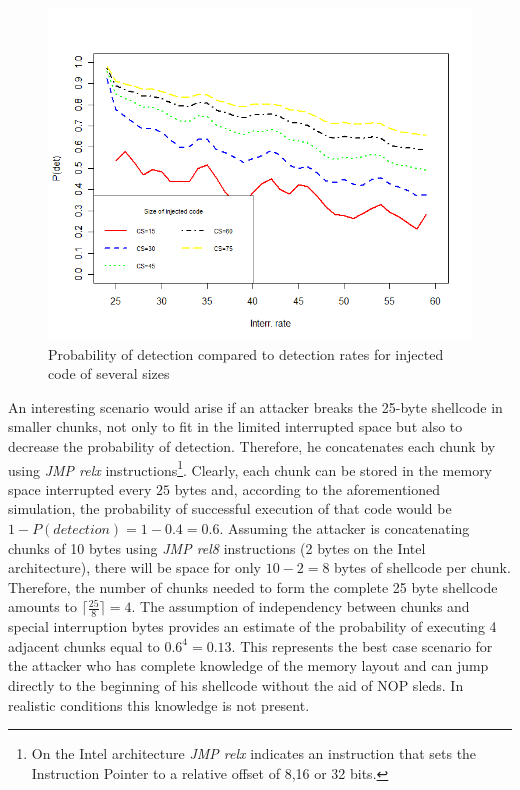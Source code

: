 \begin{figure}[htbp] 
\begin{center}
\includegraphics[scale=0.5]{images/bubble_det_intrate}
\caption{{Probability of detection compared to detection rates for injected code of several sizes}}
\label{det_intrate}
\end{center}
\end{figure}



An interesting scenario would arise if an attacker breaks the 25-byte shellcode in smaller chunks, not only to fit in the limited interrupted space but also to decrease the probability of detection. Therefore, he concatenates each chunk by using \emph{JMP relx} instructions\footnote{On the Intel architecture \emph{JMP relx} indicates an instruction that sets the Instruction Pointer to a relative offset of 8,16 or 32 bits.}. 
Clearly, each chunk can be stored in the memory space interrupted every $25$ bytes and, according to the aforementioned simulation, the probability of successful execution of that code would be $1 - P(detection) = 1 - 0.4 = 0.6$. 
Assuming the attacker is concatenating chunks of 10 bytes using \emph{JMP rel8} instructions (2 bytes on the Intel architecture), there will be space for only $10-2 = 8$ bytes of shellcode per chunk. Therefore, the number of chunks needed to form the complete 25 byte shellcode amounts to $\lceil \frac{25}{8} \rceil = 4$. 
The assumption of independency between chunks and special interruption bytes provides an estimate of the probability of executing 4 adjacent chunks equal to $0.6^4 = 0.13$.  This represents the best case scenario for the attacker who has complete knowledge of the memory layout and can jump directly to the beginning of his shellcode without the aid of NOP sleds. In realistic conditions this knowledge is not present.

